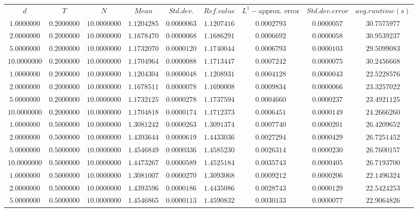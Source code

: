 \begin{tabular}{ccccccccc}
$d$ & $T$ & $N$ & $Mean$ & $Std. dev.$ & $Ref. value$ & $L^1-$approx. error & $Std. dev. error$ & $avg. runtime (s)$\\
$1.0000000$ & $0.2000000$ & $10.0000000$ & $1.1204285$ & $0.0000063$ & $1.1207416$ & $0.0002793$ & $0.0000057$ & $30.7575977$\\
$2.0000000$ & $0.2000000$ & $10.0000000$ & $1.1678470$ & $0.0000068$ & $1.1686291$ & $0.0006692$ & $0.0000058$ & $30.9539237$\\
$5.0000000$ & $0.2000000$ & $10.0000000$ & $1.1732070$ & $0.0000120$ & $1.1740044$ & $0.0006793$ & $0.0000103$ & $29.5099083$\\
$10.0000000$ & $0.2000000$ & $10.0000000$ & $1.1704964$ & $0.0000088$ & $1.1713447$ & $0.0007242$ & $0.0000075$ & $30.2456668$\\
$1.0000000$ & $0.2000000$ & $10.0000000$ & $1.1204304$ & $0.0000048$ & $1.1208931$ & $0.0004128$ & $0.0000043$ & $22.5228576$\\
$2.0000000$ & $0.2000000$ & $10.0000000$ & $1.1678511$ & $0.0000078$ & $1.1690008$ & $0.0009834$ & $0.0000066$ & $23.3257022$\\
$5.0000000$ & $0.2000000$ & $10.0000000$ & $1.1732125$ & $0.0000278$ & $1.1737594$ & $0.0004660$ & $0.0000237$ & $23.4921125$\\
$10.0000000$ & $0.2000000$ & $10.0000000$ & $1.1704818$ & $0.0000174$ & $1.1712373$ & $0.0006451$ & $0.0000149$ & $24.2666260$\\
$1.0000000$ & $0.5000000$ & $10.0000000$ & $1.3081242$ & $0.0000263$ & $1.3091374$ & $0.0007740$ & $0.0000201$ & $26.4209652$\\
$2.0000000$ & $0.5000000$ & $10.0000000$ & $1.4393644$ & $0.0000619$ & $1.4433036$ & $0.0027294$ & $0.0000429$ & $26.7251452$\\
$5.0000000$ & $0.5000000$ & $10.0000000$ & $1.4546849$ & $0.0000336$ & $1.4585230$ & $0.0026314$ & $0.0000230$ & $26.7600157$\\
$10.0000000$ & $0.5000000$ & $10.0000000$ & $1.4473267$ & $0.0000589$ & $1.4525184$ & $0.0035743$ & $0.0000405$ & $26.7193700$\\
$1.0000000$ & $0.5000000$ & $10.0000000$ & $1.3081007$ & $0.0000270$ & $1.3093068$ & $0.0009212$ & $0.0000206$ & $22.1496324$\\
$2.0000000$ & $0.5000000$ & $10.0000000$ & $1.4393596$ & $0.0000186$ & $1.4435086$ & $0.0028743$ & $0.0000129$ & $22.5424253$\\
$5.0000000$ & $0.5000000$ & $10.0000000$ & $1.4546865$ & $0.0000113$ & $1.4590832$ & $0.0030133$ & $0.0000077$ & $22.9064826$\\

\end{tabular}
